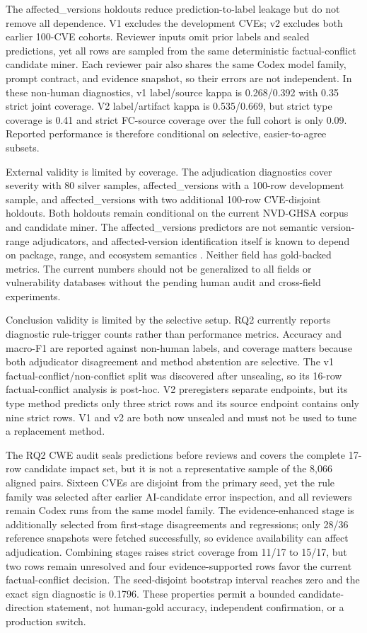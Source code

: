 The affected\_versions holdouts reduce prediction-to-label leakage but do not remove all dependence. V1 excludes the development CVEs; v2 excludes both earlier 100-CVE cohorts. Reviewer inputs omit prior labels and sealed predictions, yet all rows are sampled from the same deterministic factual-conflict candidate miner. Each reviewer pair also shares the same Codex model family, prompt contract, and evidence snapshot, so their errors are not independent. In these non-human diagnostics, v1 label/source kappa is 0.268/0.392 with 0.35 strict joint coverage. V2 label/artifact kappa is 0.535/0.669, but strict type coverage is 0.41 and strict FC-source coverage over the full cohort is only 0.09. Reported performance is therefore conditional on selective, easier-to-agree subsets.

External validity is limited by coverage. The adjudication diagnostics cover severity with 80 silver samples, affected\_versions with a 100-row development sample, and affected\_versions with two additional 100-row CVE-disjoint holdouts. Both holdouts remain conditional on the current NVD-GHSA corpus and candidate miner. The affected\_versions predictors are not semantic version-range adjudicators, and affected-version identification itself is known to depend on package, range, and ecosystem semantics \cite{OSVSchema2026,Chen2025AffectedVersions}. Neither field has gold-backed metrics. The current numbers should not be generalized to all fields or vulnerability databases without the pending human audit and cross-field experiments.

Conclusion validity is limited by the selective setup. RQ2 currently reports diagnostic rule-trigger counts rather than performance metrics. Accuracy and macro-F1 are reported against non-human labels, and coverage matters because both adjudicator disagreement and method abstention are selective. The v1 factual-conflict/non-conflict split was discovered after unsealing, so its 16-row factual-conflict analysis is post-hoc. V2 preregisters separate endpoints, but its type method predicts only three strict rows and its source endpoint contains only nine strict rows. V1 and v2 are both now unsealed and must not be used to tune a replacement method.

The RQ2 CWE audit seals predictions before reviews and covers the complete 17-row candidate impact set, but it is not a representative sample of the 8,066 aligned pairs. Sixteen CVEs are disjoint from the primary seed, yet the rule family was selected after earlier AI-candidate error inspection, and all reviewers remain Codex runs from the same model family. The evidence-enhanced stage is additionally selected from first-stage disagreements and regressions; only 28/36 reference snapshots were fetched successfully, so evidence availability can affect adjudication. Combining stages raises strict coverage from 11/17 to 15/17, but two rows remain unresolved and four evidence-supported rows favor the current factual-conflict decision. The seed-disjoint bootstrap interval reaches zero and the exact sign diagnostic is 0.1796. These properties permit a bounded candidate-direction statement, not human-gold accuracy, independent confirmation, or a production switch.

